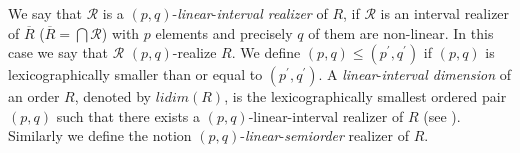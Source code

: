 \documentclass{article}
\theoremstyle{definition}
\begin{document}
We say that $\mathcal{R}$ is a $(p,q)$-{\it linear}-{\it interval realizer} of $R$, if $\mathcal{R}$ is an interval realizer of $\overline{R}$ ($\overline{R}=\displaystyle\bigcap\mathcal{R}$) with $p$ elements and precisely $q$ of them are non-linear. 
In this case we say that $\mathcal{R}$ $(p,q)$-realize $R$.
We define 
$(p,q)\leq (p^{\prime},q^{\prime})$ if $(p,q)$ is lexicographically smaller than or equal to $(p^{\prime},q^{\prime})$. A {\it linear}-{\it interval dimension} of an order $R$, denoted by $lidim(R)$, is the lexicographically smallest ordered pair $(p,q)$ such that there exists a 
$(p,q)$-linear-interval realizer of $R$ (see \cite[Page 113]{COS}). 
Similarly we define the notion $(p,q)$-{\it linear}-{\it semiorder} realizer of $R$.
\end{document}
